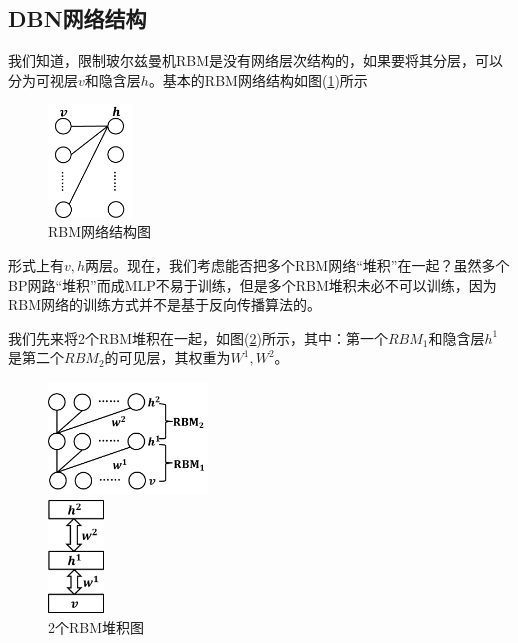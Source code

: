     \subsection{DBN网络结构}
        \par
        我们知道，限制玻尔兹曼机RBM是没有网络层次结构的，如果要将其分层，可以分为可视层$v$和隐含层$h$。基本的RBM网络结构如图(\ref{fig:RBM网络结构图})所示
            \begin{figure}[H]
            \centering
            \includegraphics[height=3cm]{images/RBM_net_structure.jpg}
            \caption{RBM网络结构图}
            \label{fig:RBM网络结构图}
            \end{figure}
        形式上有$v,h$两层。现在，我们考虑能否把多个RBM网络“堆积”在一起？虽然多个BP网路“堆积”而成MLP不易于训练，但是多个RBM堆积未必不可以训练，因为RBM网络的训练方式并不是基于反向传播算法的。
        \par
        我们先来将2个RBM堆积在一起，如图(\ref{fig:2个RBM堆积图})所示，其中：第一个$RBM_{1}$和隐含层$h^1$是第二个$RBM_{2}$的可见层，其权重为$W^1,W^2$。
\begin{figure}[H]
  \centering
  \begin{varwidth}[t]{\textwidth}
    \vspace{0pt}
    \includegraphics[height=3cm]{images/2RBM_accumulation1.jpg}
  \end{varwidth}
  \qquad\qquad
  \begin{varwidth}[t]{\textwidth}
    \vspace{0pt}
    \includegraphics[height=3cm]{images/2RBM_accumulation2.jpg}
  \end{varwidth}
  \caption{2个RBM堆积图}
  \label{fig:2个RBM堆积图}
\end{figure}
